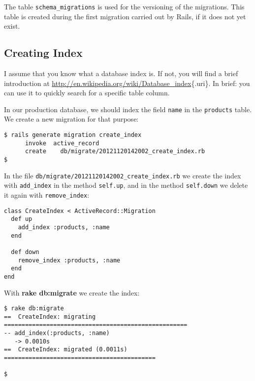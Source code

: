 \documentclass[a4paper]{book}
\newcounter{tab}[chapter]
\begin{document}
The table \texttt{schema\_migrations} is used for the versioning of the migrations. This table is created during the first migration carried out by Rails, if it does not yet exist.

\subsection{Creating Index}\label{creating-index}

I assume that you know what a database index is. If not, you will find a brief introduction at \url{http://en.wikipedia.org/wiki/Database_index}\{.uri\}. In brief: you can use it to quickly search for a specific table column.

In our production database, we should index the field \texttt{name} in the \texttt{products} table. We create a new migration for that purpose:

\begin{shaded}\begin{verbatim}
$ rails generate migration create_index
      invoke  active_record
      create    db/migrate/20121120142002_create_index.rb
$
\end{verbatim}\end{shaded}

In the file \texttt{db/migrate/20121120142002\_create\_index.rb} we create the index with \texttt{add\_index} in the method \texttt{self.up}, and in the method \texttt{self.down} we delete it again with \texttt{remove\_index}:

\begin{shaded}\begin{verbatim}
class CreateIndex < ActiveRecord::Migration
  def up
    add_index :products, :name
  end

  def down
    remove_index :products, :name
  end
end
\end{verbatim}\end{shaded}

With \textbf{rake db:migrate} we create the index:

\begin{shaded}\begin{verbatim}
$ rake db:migrate
==  CreateIndex: migrating ====================================================
-- add_index(:products, :name)
   -> 0.0010s
==  CreateIndex: migrated (0.0011s) ===========================================

$
\end{verbatim}\end{shaded}
\end{document}

